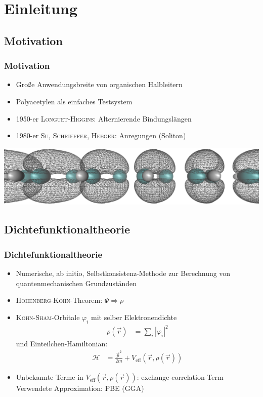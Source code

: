 \section{Einleitung}
\subsection{Motivation}
\begin{frame}
\frametitle{Motivation}
\vspace*{1cm}

\begin{itemize}
\item Große Anwendungsbreite von organischen Halbleitern
\item Polyacetylen als einfaches Testsystem
\item 1950-er \textsc{Longuet-Higgins}: Alternierende Bindungslängen
\item 1980-er \textsc{Su, Schrieffer, Heeger}: Anregungen (Soliton)
\end{itemize}
\vspace*{-.5cm}
\begin{center}
\hspace*{-4cm}\includegraphics[width = 14cm, angle = -20]{Images/polyacetylene/wavefunctions/HOMO_Side_View}
\end{center}
\end{frame}

\subsection{Dichtefunktionaltheorie}
\begin{frame}
\frametitle{Dichtefunktionaltheorie}
\begin{itemize}
\setlength{\itemsep}{.5cm}
\item Numerische, ab initio, Selbstkonsistenz-Methode zur Berechnung von quantenmechanischen Grundzuständen
\item \textsc{Hohenberg-Kohn}-Theorem: $\Psi \Rightarrow \rho$
\item \textsc{Kohn-Sham}-Orbitale $\varphi_i$ mit selber Elektronendichte
\begin{align*}
\rho(\vec{r}) &= \sum_i \left|\varphi_i\right|^2
\end{align*}
und Einteilchen-Hamiltonian:
\begin{align*}
\mathcal{H} &= \frac{\vec{p}^2}{2m} + V_\text{eff}(\vec{r}, \rho(\vec{r}))
\end{align*}
\item Unbekannte Terme in $V_\text{eff}(\vec{r}, \rho(\vec{r}))$: exchange-correlation-Term\\
Verwendete Approximation: PBE (GGA)
\end{itemize}
\end{frame}

